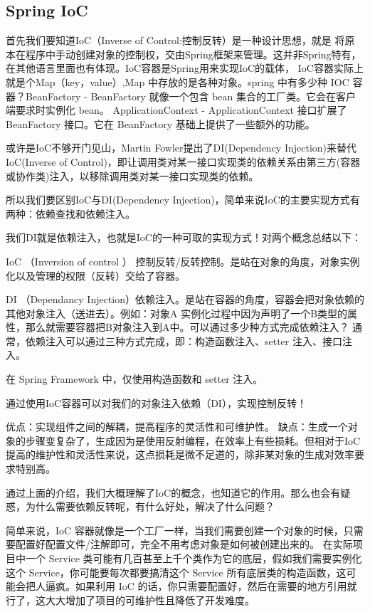 \documentclass[../../../interview-questions.tex]{subfiles}
\begin{document}
\subsection{Spring IoC}

首先我们要知道IoC（Inverse of Control:控制反转）是一种设计思想，就是 将原本在程序中手动创建对象的控制权，交由Spring框架来管理。这并非Spring特有，在其他语言里面也有体现。IoC容器是Spring用来实现IoC的载体， IoC容器实际上就是个Map（key，value）,Map 中存放的是各种对象。spring 中有多少种 IOC 容器？BeanFactory - BeanFactory 就像一个包含 bean 集合的工厂类。它会在客户端要求时实例化 bean。
ApplicationContext - ApplicationContext 接口扩展了 BeanFactory 接口。它在 BeanFactory 基础上提供了一些额外的功能。

或许是IoC不够开门见山，Martin Fowler提出了DI(Dependency Injection)来替代IoC(Inverse of Control)，即让调用类对某一接口实现类的依赖关系由第三方(容器或协作类)注入，以移除调用类对某一接口实现类的依赖。

所以我们要区别IoC与DI(Dependency Injection)，简单来说IoC的主要实现方式有两种：依赖查找和依赖注入。

我们DI就是依赖注入，也就是IoC的一种可取的实现方式！对两个概念总结以下：

IoC （Inversion of control ） 控制反转/反转控制。是站在对象的角度，对象实例化以及管理的权限（反转）交给了容器。

DI （Dependancy Injection）依赖注入。是站在容器的角度，容器会把对象依赖的其他对象注入（送进去）。例如：对象A 实例化过程中因为声明了一个B类型的属性，那么就需要容器把B对象注入到A中。可以通过多少种方式完成依赖注入？
通常，依赖注入可以通过三种方式完成，即：构造函数注入、setter 注入、接口注入。

在 Spring Framework 中，仅使用构造函数和 setter 注入。

通过使用IoC容器可以对我们的对象注入依赖（DI），实现控制反转！

优点：实现组件之间的解耦，提高程序的灵活性和可维护性。
缺点：生成一个对象的步骤变复杂了，生成因为是使用反射编程，在效率上有些损耗。但相对于IoC提高的维护性和灵活性来说，这点损耗是微不足道的，除非某对象的生成对效率要求特别高。

通过上面的介绍，我们大概理解了IoC的概念，也知道它的作用。那么也会有疑惑，为什么需要依赖反转呢，有什么好处，解决了什么问题？

简单来说，IoC 容器就像是一个工厂一样，当我们需要创建一个对象的时候，只需要配置好配置文件/注解即可，完全不用考虑对象是如何被创建出来的。 在实际项目中一个 Service 类可能有几百甚至上千个类作为它的底层，假如我们需要实例化这个 Service，你可能要每次都要搞清这个 Service 所有底层类的构造函数，这可能会把人逼疯。如果利用 IoC 的话，你只需要配置好，然后在需要的地方引用就行了，这大大增加了项目的可维护性且降低了开发难度。
\end{document}
